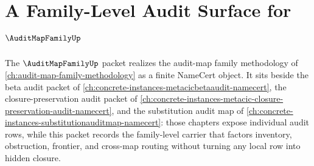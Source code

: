 \chapter{A Family-Level Audit Surface for $\AuditMapFamilyUp$}
\label{ch:concrete-instances-audit-map-family-namecert}

The $\AuditMapFamilyUp$ packet realizes the audit-map family methodology of \autoref{ch:audit-map-family-methodology} as a finite NameCert object. It sits beside the beta audit packet of \autoref{ch:concrete-instances-metacicbetaaudit-namecert}, the closure-preservation audit packet of \autoref{ch:concrete-instances-metacic-closure-preservation-audit-namecert}, and the substitution audit map of \autoref{ch:concrete-instances-substitutionauditmap-namecert}: those chapters expose individual audit rows, while this packet records the family-level carrier that factors inventory, obstruction, frontier, and cross-map routing without turning any local row into hidden closure.

